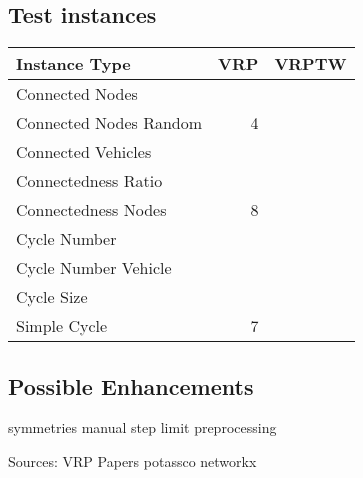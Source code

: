 \documentclass[12pt, letterpaper]{article}
\begin{document}
\subsection{Test instances}

\begin{tabular}{l | r | r}
Instance Type			& VRP	& VRPTW\\
\hline
Connected Nodes			& & \\
Connected Nodes Random		& 4& \\
Connected Vehicles			& & \\
Connectedness Ratio		& & \\
Connectedness Nodes		& 8& \\
Cycle Number			& & \\
Cycle Number Vehicle		& & \\
Cycle Size				& & \\
Simple Cycle				& 7& \\
\end{tabular}

\subsection{Possible Enhancements}
symmetries
manual step limit
preprocessing

Sources:
VRP Papers
potassco
networkx
\end{document}

